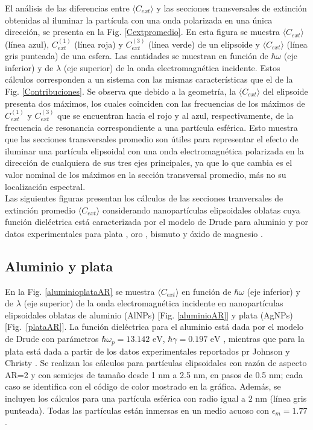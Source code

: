 El análisis de las diferencias entre $\langle C_{ext}\rangle$ y  las secciones transversales de extinción obtenidas al iluminar la partícula con una onda polarizada en una única dirección, se presenta en la Fig. \ref{Cextpromedio}. En esta figura se muestra $\langle C_{ext}\rangle$ (línea azul), $C_{ext}^{(1)}$ (línea roja) y $C_{ext}^{(3)}$ (línea verde) de un elipsoide y  $\langle C_{ext}\rangle$ (línea gris punteada) de una esfera. Las cantidades se muestran en función de $\hbar\omega$ (eje inferior) y de $\lambda$ (eje superior) de la onda electromagnética incidente. Estos cálculos corresponden a un sistema con las mismas características que el de la Fig. \ref{Contribuciones}. Se observa que debido a la geometría, la 
$\langle C_{ext}\rangle$ del elipsoide presenta dos máximos, los cuales coinciden con las frecuencias de los máximos de $C_{ext}^{(1)}$ y $C_{ext}^{(3)}$ que se encuentran hacia el rojo y al azul, respectivamente, de la frecuencia de resonancia correspondiente a una partícula esférica. Esto muestra que las secciones transversales promedio son útiles para representar el efecto de iluminar una partícula elipsoidal con una onda electromagnética polarizada en la dirección de cualquiera de sus tres ejes principales, ya que lo que cambia es el valor nominal de los máximos en la sección transversal promedio, más no su localización espectral. \\

Las siguientes figuras presentan los cálculos de las secciones tranversales de extinción promedio  $\langle C_{ext}\rangle$ considerando nanopartículas elipsoidales oblatas cuya función dieléctrica está caracterizada por el modelo de Drude para aluminio \cite{Aluminio} y por datos experimentales para plata \cite{Plata}, oro \cite{Plata}, bismuto \cite{Bismuto} y  óxido de magnesio \cite{MgO}.


\subsection*{Aluminio y plata}
En la Fig. \ref{aluminioplataAR} se muestra $\langle C_{ext}\rangle$ en función de $\hbar\omega$ (eje inferior) y de  $\lambda$ (eje superior) de la onda electromagnética incidente en nanopartículas elipsoidales oblatas de aluminio (AlNPs) [Fig. \ref{aluminioAR}] y plata (AgNPs) [Fig.~\ref{plataAR}]. La función dieléctrica para el aluminio está dada por el modelo de Drude con parámetros $\hbar\omega_p=13.142\text{ eV}$, $\hbar\gamma=0.197\text{ eV}$ \cite{Aluminio}, mientras que para la plata  está dada a partir de los datos experimentales reportados pr Johnson y Christy \cite{Plata}. Se realizan los cálculos para partículas elipsoidales con razón de aspecto AR=2 y con semiejes de tamaño desde 1 nm a 2.5 nm, en pasos de 0.5 nm; cada caso se identifica con el código de color mostrado en la gráfica. Además, se incluyen los cálculos para una partícula esférica con radio igual a $2 \text{ nm}$ (línea gris punteada). Todas las partículas están  inmersas en un medio acuoso con $\epsilon_m=1.77$.\\

